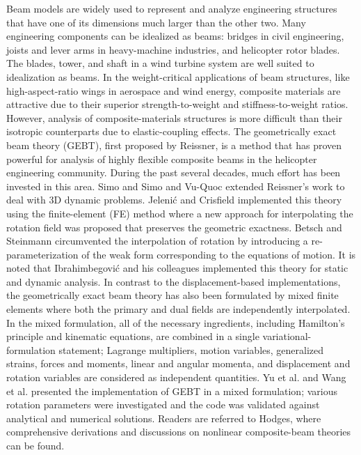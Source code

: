 Beam models are widely used to represent and analyze engineering structures
that have one of its dimensions much larger than the other two. Many
engineering components can be idealized as beams: bridges in civil
engineering, joists and lever arms in heavy-machine industries, and
helicopter rotor blades. The blades, tower, and shaft in a wind turbine
system are well suited to idealization as beams. In the weight-critical
applications of beam structures, like high-aspect-ratio wings in aerospace
and wind energy, composite materials are attractive due to their superior
strength-to-weight and stiffness-to-weight ratios.  However, analysis of
composite-materials structures is more difficult than their isotropic
counterparts due to elastic-coupling effects. The geometrically exact beam
theory (GEBT), first proposed by Reissner\cite{Ressiner1973}, is a
method that has proven powerful for analysis of highly flexible composite
beams in the helicopter engineering community. During the past several
decades, much effort has been invested in this area. Simo\cite{Simo1985} and
Simo and Vu-Quoc\cite{Simo1986} extended Reissner's work to deal with 3D
dynamic problems. Jeleni\'c and Crisfield\cite{Crisfield1999} implemented
this theory using the finite-element (FE) method where a new approach for
interpolating the rotation field was proposed that preserves the geometric
exactness. Betsch and Steinmann\cite{Betsch2002} circumvented the
interpolation of rotation by introducing a re-parameterization of the weak
form corresponding to the equations of motion. It is noted that
Ibrahimbegovi\'c and his colleagues implemented this theory for
static\cite{Ibrahim1995} and dynamic\cite{Ibrahim1998} analysis. In contrast
to the displacement-based implementations, the geometrically exact beam theory
has also been formulated by mixed finite elements where both the primary and
dual fields are independently interpolated. In the mixed formulation, all of the necessary
ingredients, including Hamilton's principle and kinematic equations, are
combined in a single variational-formulation statement; Lagrange
multipliers, motion variables, generalized strains, forces and moments,
linear and angular momenta, and displacement and rotation variables are
considered as independent quantities. Yu et al.\cite{YuGEBT} and Wang et
al.\cite{Wang:GEBT2013}
presented the implementation of GEBT in a mixed formulation; various
rotation parameters were investigated and the code was validated against
analytical and numerical solutions. Readers are referred to
Hodges\cite{HodgesBeamBook}, where comprehensive derivations and discussions
on nonlinear composite-beam theories can be found.

